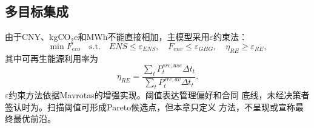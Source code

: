 \subsection{多目标集成}

由于CNY、kgCO$_2$e和MWh不能直接相加，主模型采用$\varepsilon$约束法：
\begin{equation}
\min F_{eco}
\quad\mathrm{s.t.}\quad
ENS\le\varepsilon_{ENS},\quad
F_{env}\le\varepsilon_{GHG},\quad
\eta_{RE}\ge\varepsilon_{RE},
\label{eq:epsilon-constraint}
\end{equation}
其中可再生能源利用率为
\begin{equation}
\eta_{RE}=\frac{\sum_tP_t^{src,use}\Delta t_t}
{\sum_tP_t^{src,av}\Delta t_t}.
\label{eq:renewable-utilization}
\end{equation}
$\varepsilon$约束方法依据Mavrotas的增强实现\cite{mavrotas2009}。阈值表达管理偏好和合同
底线，未经决策者签认时为\assumptiontag。扫描阈值可形成Pareto候选点，但本章只定义
方法，不呈现或宣称最终最优前沿。

